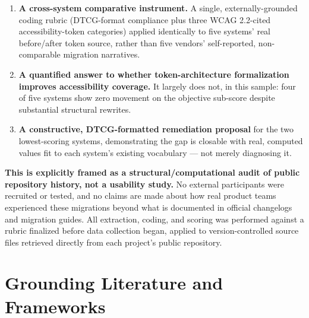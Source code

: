 \documentclass[11pt]{article}
\begin{document}
\begin{enumerate}[leftmargin=1.4em]
\item \textbf{A cross-system comparative instrument.} A single, externally-grounded coding rubric (DTCG-format compliance plus three WCAG 2.2-cited accessibility-token categories) applied identically to five systems' real before/after token source, rather than five vendors' self-reported, non-comparable migration narratives.
\item \textbf{A quantified answer to whether token-architecture formalization improves accessibility coverage.} It largely does not, in this sample: four of five systems show zero movement on the objective sub-score despite substantial structural rewrites.
\item \textbf{A constructive, DTCG-formatted remediation proposal} for the two lowest-scoring systems, demonstrating the gap is closable with real, computed values fit to each system's existing vocabulary --- not merely diagnosing it.
\end{enumerate}

\noindent\textbf{This is explicitly framed as a structural/computational audit of public repository history, not a usability study.} No external participants were recruited or tested, and no claims are made about how real product teams experienced these migrations beyond what is documented in official changelogs and migration guides. All extraction, coding, and scoring was performed against a rubric finalized before data collection began, applied to version-controlled source files retrieved directly from each project's public repository.

\section{Grounding Literature and Frameworks}
\end{document}
